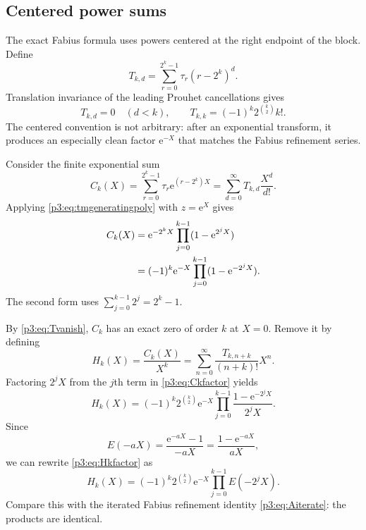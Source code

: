 \documentclass[11pt,oneside]{article}
\theoremstyle{definition}
\theoremstyle{remark}
\newcommand{\e}{\mathrm e}
\newcommand{\tm}{\tau}
\begin{document}
\subsection{Centered power sums}

The exact Fabius formula uses powers centered at the right endpoint of the block.  Define
\begin{equation}\label{p3:eq:Tkd}
 T_{k,d}=\sum_{r=0}^{2^k-1}\tm_r(r-2^k)^d.
\end{equation}
Translation invariance of the leading Prouhet cancellations gives
\begin{equation}\label{p3:eq:Tvanish}
 T_{k,d}=0\quad(d<k),
 \qquad
 T_{k,k}=(-1)^k2^{\binom{k}{2}}k!.
\end{equation}
The centered convention is not arbitrary: after an exponential transform, it produces an especially clean factor $\e^{-X}$ that matches the Fabius refinement series.

Consider the finite exponential sum
\begin{equation}\label{p3:eq:Ckdef}
 C_k(X)=\sum_{r=0}^{2^k-1}\tm_r\e^{(r-2^k)X}
       =\sum_{d=0}^{\infty}T_{k,d}\frac{X^d}{d!}.
\end{equation}
Applying \eqref{p3:eq:tmgeneratingpoly} with $z=\e^X$ gives
\begin{align}
 C_k(X)
 &=\e^{-2^kX}\prod_{j=0}^{k-1}(1-\e^{2^jX})\notag\\
 &=(-1)^k\e^{-X}\prod_{j=0}^{k-1}(1-\e^{-2^jX}).
 \label{p3:eq:Ckfactor}
\end{align}
The second form uses $\sum_{j=0}^{k-1}2^j=2^k-1$.

By \eqref{p3:eq:Tvanish}, $C_k$ has an exact zero of order $k$ at $X=0$.  Remove it by defining
\begin{equation}\label{p3:eq:Hkdef}
 H_k(X)=\frac{C_k(X)}{X^k}
       =\sum_{n=0}^{\infty}
         \frac{T_{k,n+k}}{(n+k)!}X^n.
\end{equation}
Factoring $2^jX$ from the $j$th term in \eqref{p3:eq:Ckfactor} yields
\begin{equation}\label{p3:eq:Hkfactor}
 \boxed{
 H_k(X)=(-1)^k2^{\binom{k}{2}}\e^{-X}
 \prod_{j=0}^{k-1}
 \frac{1-\e^{-2^jX}}{2^jX}.}
\end{equation}
Since
\begin{equation}\label{p3:eq:Enegative}
 E(-aX)=\frac{\e^{-aX}-1}{-aX}
       =\frac{1-\e^{-aX}}{aX},
\end{equation}
we can rewrite \eqref{p3:eq:Hkfactor} as
\begin{equation}\label{p3:eq:HkE}
 \boxed{
 H_k(X)=(-1)^k2^{\binom{k}{2}}\e^{-X}
 \prod_{j=0}^{k-1}E(-2^jX).}
\end{equation}
Compare this with the iterated Fabius refinement identity \eqref{p3:eq:Aiterate}: the products are identical.
\end{document}
